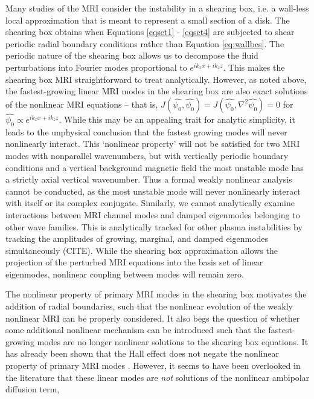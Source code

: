 \documentclass{emulateapj}
\begin{document}
Many studies of the MRI consider the instability in a shearing box, i.e. a wall-less local approximation that is meant to represent a small section of a disk. The shearing box obtains when Equations \ref{eqset1} - \ref{eqset4} are subjected to shear periodic radial boundary conditions rather than Equation \ref{eq:wallbcs}. The periodic nature of the shearing box allows us to decompose the fluid perturbations into Fourier modes proportional to $e^{i k_x x + i k_z z}$. This makes the shearing box MRI straightforward to treat analytically. However, as noted above, the fastest-growing linear MRI modes in the shearing box are also exact solutions of the nonlinear MRI equations -- that is, $J(\hat{\psi_0}, \hat{\psi_0}) = J(\hat{\psi_0}, \nabla^2 \hat{\psi_0}) = 0$ for $\hat{\psi_0} \propto e^{i k_x x + i k_z z}$. While this may be an appealing trait for analytic simplicity, it leads to the unphysical conclusion that the fastest growing modes will never nonlinearly interact. This `nonlinear property' will not be satisfied for two MRI modes with nonparallel wavenumbers, but with vertically periodic boundary conditions and a vertical background magnetic field the most unstable mode has a strictly axial vertical wavenumber. Thus a formal weakly nonlinear analysis cannot be conducted, as the most unstable mode will never nonlinearly interact with itself or its complex conjugate. Similarly, we cannot analytically examine interactions between MRI channel modes and damped eigenmodes belonging to other wave families. This is analytically tracked for other plasma instabilities by tracking the amplitudes of growing, marginal, and damped eigenmodes simultaneously (CITE). While the shearing box approximation allows the projection of the perturbed MRI equations into the basis set of linear eigenmodes, nonlinear coupling between modes will remain zero.

The nonlinear property of primary MRI modes in the shearing box motivates the addition of radial boundaries, such that the nonlinear evolution of the weakly nonlinear MRI can be properly considered. It also begs the question of whether some additional nonlinear mechanism can be introduced such that the fastest-growing modes are no longer nonlinear solutions to the shearing box equations. It has already been shown that the Hall effect does not negate the nonlinear property of primary MRI modes \citep{Kunz:2013}. However, it seems to have been overlooked in the literature that these linear modes are \textit{not} solutions of the nonlinear ambipolar diffusion term, 
\end{document}
